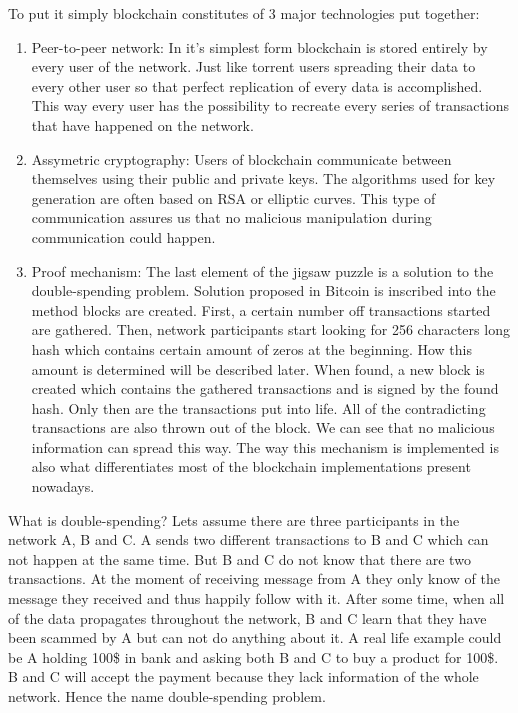 \documentclass[a4paper,12pt,twoside,openany]{report}
\begin{document}
To put it simply blockchain constitutes of 3 major technologies put together:
\begin{enumerate}
\item Peer-to-peer network: In it's simplest form blockchain is stored entirely by every user of the network. Just like torrent users spreading their data to every other user so that perfect replication of every data is accomplished. This way every user has the possibility to recreate every series of transactions that have happened on the network.
\item Assymetric cryptography: Users of blockchain communicate between themselves using their public and private keys. The algorithms used for key generation are often based on RSA or elliptic curves. This type of communication assures us that no malicious manipulation during communication could happen.
\item Proof mechanism: The last element of the jigsaw puzzle is a solution to the double-spending problem.       Solution proposed in Bitcoin is inscribed into the method blocks are created. First, a certain number off transactions started are gathered. Then, network participants start looking for 256 characters long hash which contains certain amount of zeros at the beginning. How this amount is determined will be described later. When found, a new block is created which contains the gathered transactions and is signed by the found hash. Only then are the transactions put into life. All of the contradicting transactions are also thrown out of the block. We can see that no malicious information can spread this way. The way this mechanism is implemented is also what differentiates most of the blockchain implementations present nowadays. 
\end{enumerate}
What is double-spending? Lets assume there are three participants in the network A, B and C. A sends two different transactions to B and C which can not happen at the same time. But B and C do not know that there are two transactions. At the moment of receiving message from A they only know of the message they received and thus happily follow with it. After some time, when all of the data propagates throughout the network, B and C learn that they have been scammed by A but can not do anything about it. A real life example could be A holding 100\$ in bank and asking both B and C to buy a product for 100\$. B and C will accept the payment because they lack information of the whole network. Hence the name double-spending problem.  
\end{document}
